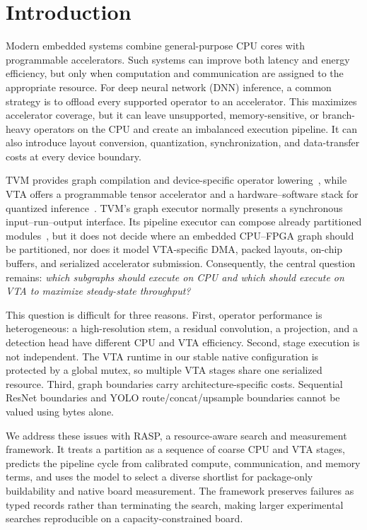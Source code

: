 \documentclass[conference]{IEEEtran}
\newcommand{\framework}{RASP}
\begin{document}
\section{Introduction}

Modern embedded systems combine general-purpose CPU cores with programmable accelerators. Such systems can improve both latency and energy efficiency, but only when computation and communication are assigned to the appropriate resource. For deep neural network (DNN) inference, a common strategy is to offload every supported operator to an accelerator. This maximizes accelerator coverage, but it can leave unsupported, memory-sensitive, or branch-heavy operators on the CPU and create an imbalanced execution pipeline. It can also introduce layout conversion, quantization, synchronization, and data-transfer costs at every device boundary.

TVM provides graph compilation and device-specific operator lowering~\cite{chen2018tvm}, while VTA offers a programmable tensor accelerator and a hardware--software stack for quantized inference~\cite{moreau2019vta}. TVM's graph executor normally presents a synchronous input--run--output interface. Its pipeline executor can compose already partitioned modules~\cite{tvm_pipeline_executor}, but it does not decide where an embedded CPU--FPGA graph should be partitioned, nor does it model VTA-specific DMA, packed layouts, on-chip buffers, and serialized accelerator submission. Consequently, the central question remains: \emph{which subgraphs should execute on CPU and which should execute on VTA to maximize steady-state throughput?}

This question is difficult for three reasons. First, operator performance is heterogeneous: a high-resolution stem, a residual convolution, a projection, and a detection head have different CPU and VTA efficiency. Second, stage execution is not independent. The VTA runtime in our stable native configuration is protected by a global mutex, so multiple VTA stages share one serialized resource. Third, graph boundaries carry architecture-specific costs. Sequential ResNet boundaries and YOLO route/concat/upsample boundaries cannot be valued using bytes alone.

We address these issues with \framework, a resource-aware search and measurement framework. It treats a partition as a sequence of coarse CPU and VTA stages, predicts the pipeline cycle from calibrated compute, communication, and memory terms, and uses the model to select a diverse shortlist for package-only buildability and native board measurement. The framework preserves failures as typed records rather than terminating the search, making larger experimental searches reproducible on a capacity-constrained board.
\end{document}
